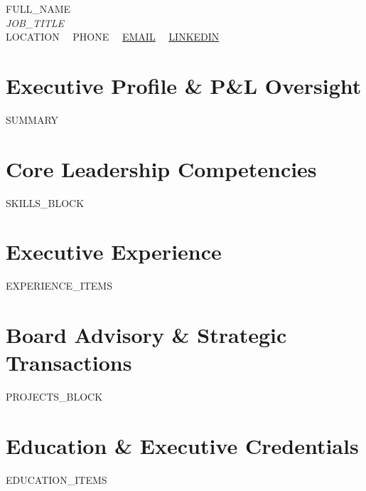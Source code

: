 \documentclass[10pt,letterpaper]{article}
\begin{document}
\begin{center}
  {\Huge \textsc{{{FULL_NAME}}}} \\[4pt]
  {\normalsize \textit{{{JOB_TITLE}}}} \\[6pt]
  \small
  {{LOCATION}} \ \textbar \ 
  {{PHONE}} \ \textbar \ 
  \href{mailto:{{EMAIL}}}{{{EMAIL}}} \ \textbar \ 
  \href{https://{{LINKEDIN}}}{{{LINKEDIN}}}
\end{center}

\vspace{2pt}

\section{Executive Profile \& P\&L Oversight}
{{SUMMARY}}

\section{Core Leadership Competencies}
{{SKILLS_BLOCK}}

\section{Executive Experience}
{{EXPERIENCE_ITEMS}}

\section{Board Advisory \& Strategic Transactions}
{{PROJECTS_BLOCK}}

\section{Education \& Executive Credentials}
{{EDUCATION_ITEMS}}
\end{document}
